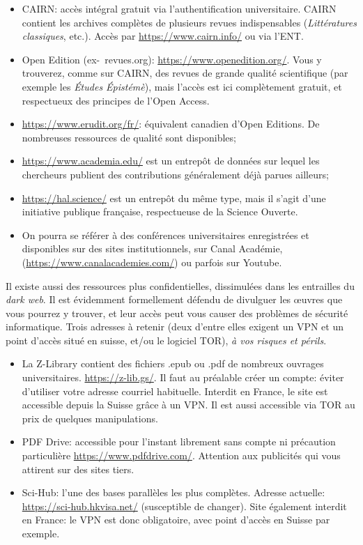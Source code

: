 \documentclass[12pt,twoside,final,openright]{book}
\begin{document}
\begin{itemize}
	\item CAIRN: accès intégral gratuit via l'authentification universitaire. CAIRN contient les archives complètes de plusieurs revues 	indispensables (\textit{Littératures classiques}, etc.). Accès par \url{https://www.cairn.info/} ou via l'ENT.
	\item Open Edition (ex-~revues.org): \url{https://www.openedition.org/}. Vous y trouverez, comme sur CAIRN, des revues de grande qualité scientifique (par exemple les \textit{Études Épistémè}), mais l'accès	est ici complètement gratuit, et respectueux des principes de l'Open Access.
	\item \url{https://www.erudit.org/fr/}: équivalent canadien d'Open
	Editions. De nombreuses ressources de qualité sont disponibles;
	\item \url{https://www.academia.edu/} est un entrepôt de données sur lequel les chercheurs publient des contributions généralement déjà parues ailleurs;
	\item \url{https://hal.science/} est un entrepôt du même type, mais il
	s'agit d'une initiative publique française, respectueuse de la Science
	Ouverte.
	\item On pourra se référer à des conférences universitaires enregistrées et disponibles sur des sites institutionnels, sur Canal Académie, (\url{https://www.canalacademies.com/}) ou parfois sur Youtube.
\end{itemize}

Il existe aussi des ressources plus confidentielles, dissimulées dans
les entrailles du \textit{dark web}. Il est évidemment formellement
défendu de divulguer les \oe uvres que vous pourrez y trouver, et leur
accès peut vous causer des problèmes de sécurité informatique. Trois
adresses à retenir (deux d'entre elles exigent un VPN et un point
d'accès situé en suisse, et/ou le logiciel TOR), \textit{à vos risques et
	périls}.

\begin{itemize}
	\item La Z-Library contient des fichiers .epub ou .pdf de nombreux ouvrages universitaires. \url{https://z-lib.gs/}. Il faut au préalable
	créer un compte: éviter d'utiliser votre adresse courriel habituelle.
	Interdit en France, le site est accessible depuis la Suisse grâce à un
	VPN. Il est aussi accessible via TOR au prix de quelques
	manipulations.
	\item PDF Drive: accessible pour l'instant librement sans compte ni
	précaution particulière \url{https://www.pdfdrive.com/}. Attention
	aux publicités qui vous attirent sur des sites tiers.
	\item Sci-Hub: l'une des bases parallèles les plus complètes. Adresse
	actuelle: \url{https://sci-hub.hkvisa.net/} (susceptible de changer).
	Site également interdit en France: le VPN est donc obligatoire, avec
	point d'accès en Suisse par exemple.
\end{itemize}
\end{document}
